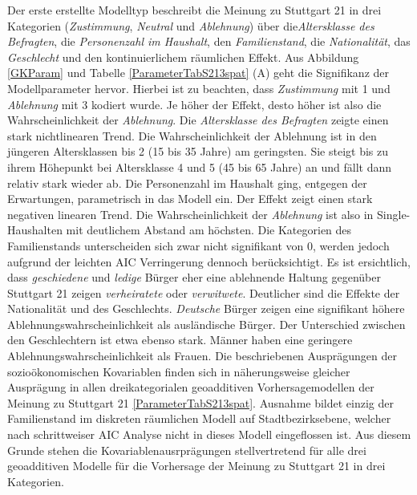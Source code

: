 \documentclass{Vorlage}
\begin{document}
Der erste erstellte Modelltyp beschreibt die Meinung zu Stuttgart 21 in drei Kategorien (\textit{Zustimmung}, \textit{Neutral} und \textit{Ablehnung}) über die\textit{Altersklasse des Befragten}, die \textit{Personenzahl im Haushalt}, den \textit{Familienstand}, die \textit{Nationalität}, das \textit{Geschlecht} und den kontinuierlichem räumlichen Effekt. Aus Abbildung \ref{GKParam} und Tabelle \ref{ParameterTabS213spat} (A) geht die Signifikanz der Modellparameter hervor. Hierbei ist zu beachten, dass \textit{Zustimmung} mit 1 und \textit{Ablehnung} mit 3 kodiert wurde. Je höher der Effekt, desto höher ist also die Wahrscheinlichkeit der \textit{Ablehnung}. Die \textit{Altersklasse des Befragten} zeigte einen stark nichtlinearen Trend. Die Wahrscheinlichkeit der Ablehnung ist in den jüngeren Altersklassen bis 2 (15 bis 35 Jahre) am geringsten. Sie steigt bis zu ihrem Höhepunkt bei Altersklasse  4 und 5 (45 bis 65 Jahre) an und fällt dann relativ stark wieder ab. Die Personenzahl im Haushalt ging, entgegen der Erwartungen, parametrisch in das Modell ein. Der Effekt zeigt einen stark negativen linearen Trend. Die Wahrscheinlichkeit der \textit{Ablehnung} ist also in Single-Haushalten mit deutlichem Abstand am höchsten. Die Kategorien des Familienstands unterscheiden sich zwar nicht signifikant von 0, werden jedoch aufgrund der leichten AIC Verringerung dennoch berücksichtigt. Es ist ersichtlich, dass \textit{geschiedene} und \textit{ledige} Bürger eher eine ablehnende Haltung gegenüber Stuttgart 21 zeigen \textit{verheiratete} oder \textit{verwitwete}. Deutlicher sind die Effekte der Nationalität und des Geschlechts. \textit{Deutsche} Bürger zeigen eine signifikant höhere Ablehnungswahrscheinlichkeit als ausländische Bürger. Der Unterschied zwischen den Geschlechtern ist etwa ebenso stark. Männer haben eine geringere Ablehnungswahrscheinlichkeit als Frauen. Die beschriebenen Ausprägungen der sozioökonomischen Kovariablen finden sich in näherungsweise gleicher Ausprägung in allen dreikategorialen geoadditiven Vorhersagemodellen der Meinung zu Stuttgart 21 \ref{ParameterTabS213spat}. Ausnahme bildet einzig der Familienstand im diskreten räumlichen Modell auf Stadtbezirksebene, welcher nach schrittweiser AIC Analyse nicht in dieses Modell eingeflossen ist. Aus diesem Grunde stehen die Kovariablenausrprägungen stellvertretend für alle drei geoadditiven Modelle für die Vorhersage der Meinung zu Stuttgart 21 in drei Kategorien.\\
\end{document}
